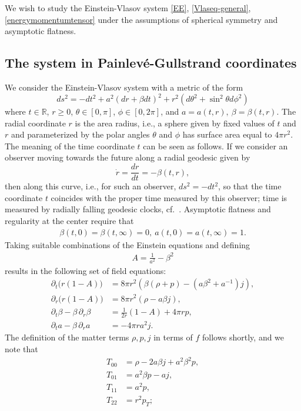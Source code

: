 \documentclass[11pt]{article}
\def\R{\mathbb R}
\begin{document}
We wish to study the Einstein-Vlasov system
\eqref{EE}, \eqref{Vlaseq-general}, \eqref{energymomentumtensor}
under the assumptions of spherical symmetry and asymptotic flatness.
%
%
\subsection{The system in Painlev\'{e}-Gullstrand coordinates}
\label{section_ev_pg}
%
%
We consider the Einstein-Vlasov system with a metric of the form
\[
ds^2 = - dt^2 + a^2 (dr + \beta dt)^2 +
r^2 \left( d\theta^2 + \sin^2\theta d\phi^2\right) 
\]
where $t\in \R$, $r\geq 0$, $\theta\in [0,\pi]$, $\phi\in [0,2 \pi]$,
and $a=a(t,r),\ \beta=\beta(t,r)$. The radial coordinate $r$ is the
area radius, i.e., a sphere given by fixed values of $t$ and $r$
and parameterized by the polar angles $\theta$ and $\phi$ has
surface area equal to $4\pi r^2$. The meaning of the time coordinate
$t$ can be seen as follows. If we consider an observer moving
towards the future along a radial geodesic given by
\[
\dot r = \frac{dr}{dt} = - \beta(t,r), 
\]
then along this curve, i.e., for such an observer, $ds^2 = - dt^2$,
so that the time coordinate $t$ coincides with the proper time measured
by this observer; time is measured by radially falling geodesic clocks,
cf.~\cite{GC}.
Asymptotic flatness and regularity at the center require that
\begin{align} \label{bc}
\beta(t,0)=\beta(t,\infty) =0,\ a(t,0) = a(t,\infty)=1.
\end{align}
Taking suitable combinations
of the Einstein equations and defining
\begin{align} \label{Adef}
  A = \frac{1}{a^2} - \beta^2
\end{align}
results in the following set of field equations:
\begin{align}
  \partial_t\big(r(1-A)\big)
  &=
  8\pi r^2\left(\beta(\rho + p) - (a\beta^2 + a^{-1})j\right),\label{ee1}\\
  \partial_r\big(r(1-A)\big)
  &=
  8\pi r^2(\rho-a\beta j),\label{ee2}\\
  \partial_t\beta-\beta\,\partial_r\beta
  &=
  \frac{1}{2r}(1-A)+4\pi rp,\label{ee3}\\
  \partial_t a-\beta\,\partial_r a
  &=
  -4\pi r a^2 j.\label{ee4}
\end{align}
The definition of the matter terms $\rho, p, j$ in terms of $f$
follows shortly, and we note that
\begin{align*}
  T_{00}
  &= \rho - 2 a \beta j + a^2 \beta^2 p,\\
  T_{01}
  &= a^2 \beta p - a j,\\
  T_{11}
  &= a^2 p,\\
  T_{22}
  &= r^2 p_T;
\end{align*}
\end{document}
